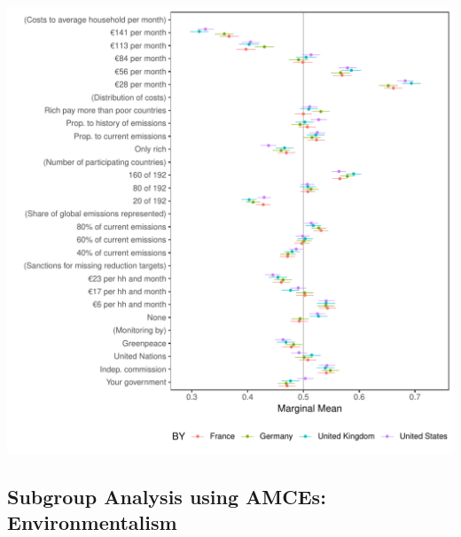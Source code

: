 \documentclass[a4paper,12pt]{article}\usepackage[]{graphicx}\usepackage[]{color}
\makeatletter
\def\maxwidth{ %
  \ifdim\Gin@nat@width>\linewidth
    \linewidth
  \else
    \Gin@nat@width
  \fi
}
\newenvironment{knitrout}{}{} %
\makeatother
\begin{document}
\begin{knitrout}
\color{fgcolor}
\includegraphics[width=\maxwidth]{figure/bechtel_subgroup_mm-1} 

\end{knitrout}

\clearpage



\clearpage

\subsection{Subgroup Analysis using AMCEs: Environmentalism}
\end{document}
